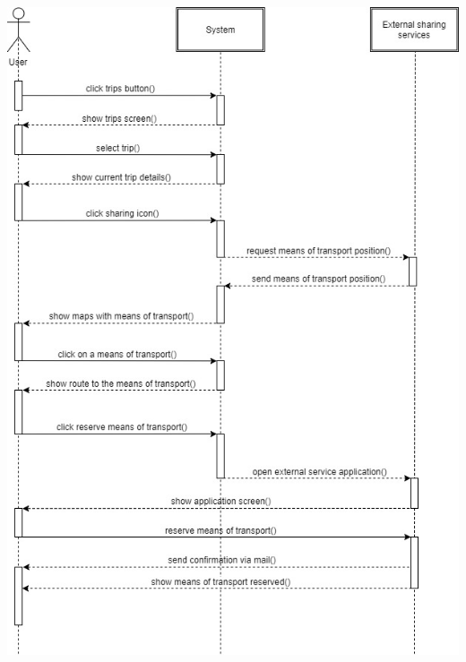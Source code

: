 \begin{center}
\includegraphics[scale=0.55]{MainMatter/images/sequencediagrams/reservesharing}
\end{center}


